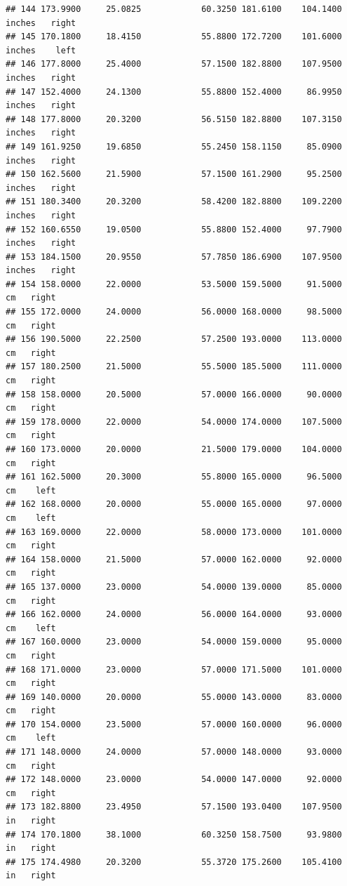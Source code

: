 \documentclass[]{article}
\begin{document}
\begin{verbatim}
## 144 173.9900     25.0825            60.3250 181.6100    104.1400 inches   right
## 145 170.1800     18.4150            55.8800 172.7200    101.6000 inches    left
## 146 177.8000     25.4000            57.1500 182.8800    107.9500 inches   right
## 147 152.4000     24.1300            55.8800 152.4000     86.9950 inches   right
## 148 177.8000     20.3200            56.5150 182.8800    107.3150 inches   right
## 149 161.9250     19.6850            55.2450 158.1150     85.0900 inches   right
## 150 162.5600     21.5900            57.1500 161.2900     95.2500 inches   right
## 151 180.3400     20.3200            58.4200 182.8800    109.2200 inches   right
## 152 160.6550     19.0500            55.8800 152.4000     97.7900 inches   right
## 153 184.1500     20.9550            57.7850 186.6900    107.9500 inches   right
## 154 158.0000     22.0000            53.5000 159.5000     91.5000     cm   right
## 155 172.0000     24.0000            56.0000 168.0000     98.5000     cm   right
## 156 190.5000     22.2500            57.2500 193.0000    113.0000     cm   right
## 157 180.2500     21.5000            55.5000 185.5000    111.0000     cm   right
## 158 158.0000     20.5000            57.0000 166.0000     90.0000     cm   right
## 159 178.0000     22.0000            54.0000 174.0000    107.5000     cm   right
## 160 173.0000     20.0000            21.5000 179.0000    104.0000     cm   right
## 161 162.5000     20.3000            55.8000 165.0000     96.5000     cm    left
## 162 168.0000     20.0000            55.0000 165.0000     97.0000     cm    left
## 163 169.0000     22.0000            58.0000 173.0000    101.0000     cm   right
## 164 158.0000     21.5000            57.0000 162.0000     92.0000     cm   right
## 165 137.0000     23.0000            54.0000 139.0000     85.0000     cm   right
## 166 162.0000     24.0000            56.0000 164.0000     93.0000     cm    left
## 167 160.0000     23.0000            54.0000 159.0000     95.0000     cm   right
## 168 171.0000     23.0000            57.0000 171.5000    101.0000     cm   right
## 169 140.0000     20.0000            55.0000 143.0000     83.0000     cm   right
## 170 154.0000     23.5000            57.0000 160.0000     96.0000     cm    left
## 171 148.0000     24.0000            57.0000 148.0000     93.0000     cm   right
## 172 148.0000     23.0000            54.0000 147.0000     92.0000     cm   right
## 173 182.8800     23.4950            57.1500 193.0400    107.9500     in   right
## 174 170.1800     38.1000            60.3250 158.7500     93.9800     in   right
## 175 174.4980     20.3200            55.3720 175.2600    105.4100     in   right

\end{verbatim}
\end{document}

